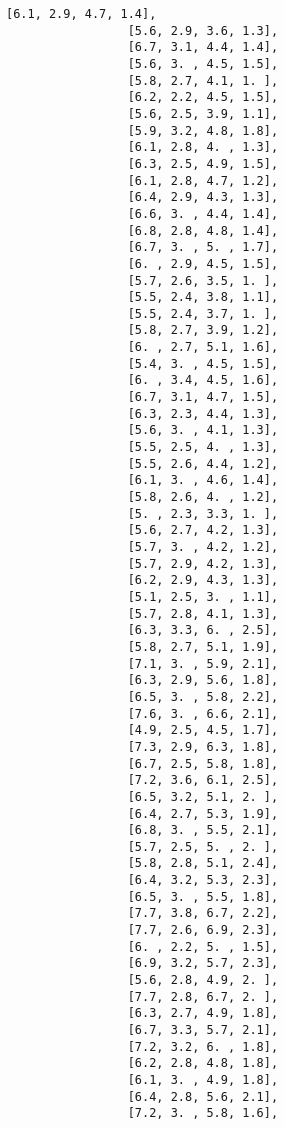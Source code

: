 \documentclass[11pt]{article}
\begin{document}
\begin{Verbatim}[commandchars=\\\{\}]
                 [6.1, 2.9, 4.7, 1.4],
                 [5.6, 2.9, 3.6, 1.3],
                 [6.7, 3.1, 4.4, 1.4],
                 [5.6, 3. , 4.5, 1.5],
                 [5.8, 2.7, 4.1, 1. ],
                 [6.2, 2.2, 4.5, 1.5],
                 [5.6, 2.5, 3.9, 1.1],
                 [5.9, 3.2, 4.8, 1.8],
                 [6.1, 2.8, 4. , 1.3],
                 [6.3, 2.5, 4.9, 1.5],
                 [6.1, 2.8, 4.7, 1.2],
                 [6.4, 2.9, 4.3, 1.3],
                 [6.6, 3. , 4.4, 1.4],
                 [6.8, 2.8, 4.8, 1.4],
                 [6.7, 3. , 5. , 1.7],
                 [6. , 2.9, 4.5, 1.5],
                 [5.7, 2.6, 3.5, 1. ],
                 [5.5, 2.4, 3.8, 1.1],
                 [5.5, 2.4, 3.7, 1. ],
                 [5.8, 2.7, 3.9, 1.2],
                 [6. , 2.7, 5.1, 1.6],
                 [5.4, 3. , 4.5, 1.5],
                 [6. , 3.4, 4.5, 1.6],
                 [6.7, 3.1, 4.7, 1.5],
                 [6.3, 2.3, 4.4, 1.3],
                 [5.6, 3. , 4.1, 1.3],
                 [5.5, 2.5, 4. , 1.3],
                 [5.5, 2.6, 4.4, 1.2],
                 [6.1, 3. , 4.6, 1.4],
                 [5.8, 2.6, 4. , 1.2],
                 [5. , 2.3, 3.3, 1. ],
                 [5.6, 2.7, 4.2, 1.3],
                 [5.7, 3. , 4.2, 1.2],
                 [5.7, 2.9, 4.2, 1.3],
                 [6.2, 2.9, 4.3, 1.3],
                 [5.1, 2.5, 3. , 1.1],
                 [5.7, 2.8, 4.1, 1.3],
                 [6.3, 3.3, 6. , 2.5],
                 [5.8, 2.7, 5.1, 1.9],
                 [7.1, 3. , 5.9, 2.1],
                 [6.3, 2.9, 5.6, 1.8],
                 [6.5, 3. , 5.8, 2.2],
                 [7.6, 3. , 6.6, 2.1],
                 [4.9, 2.5, 4.5, 1.7],
                 [7.3, 2.9, 6.3, 1.8],
                 [6.7, 2.5, 5.8, 1.8],
                 [7.2, 3.6, 6.1, 2.5],
                 [6.5, 3.2, 5.1, 2. ],
                 [6.4, 2.7, 5.3, 1.9],
                 [6.8, 3. , 5.5, 2.1],
                 [5.7, 2.5, 5. , 2. ],
                 [5.8, 2.8, 5.1, 2.4],
                 [6.4, 3.2, 5.3, 2.3],
                 [6.5, 3. , 5.5, 1.8],
                 [7.7, 3.8, 6.7, 2.2],
                 [7.7, 2.6, 6.9, 2.3],
                 [6. , 2.2, 5. , 1.5],
                 [6.9, 3.2, 5.7, 2.3],
                 [5.6, 2.8, 4.9, 2. ],
                 [7.7, 2.8, 6.7, 2. ],
                 [6.3, 2.7, 4.9, 1.8],
                 [6.7, 3.3, 5.7, 2.1],
                 [7.2, 3.2, 6. , 1.8],
                 [6.2, 2.8, 4.8, 1.8],
                 [6.1, 3. , 4.9, 1.8],
                 [6.4, 2.8, 5.6, 2.1],
                 [7.2, 3. , 5.8, 1.6],

\end{Verbatim}
\end{document}
